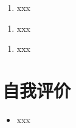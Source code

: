 \documentclass{resume}
\begin{document}
\begin{enumerate}[parsep=0.5ex]
    \item xxx
\end{enumerate}
\vspace{1mm}

\begin{enumerate}[parsep=0.5ex]
    \item xxx
\end{enumerate}

\begin{enumerate}[parsep=0.5ex]
    \item xxx
\end{enumerate}
\vspace{3mm}

\section{自我评价}

\begin{itemize}[parsep=0.5ex]
  \item xxx
\end{itemize}
\end{document}
